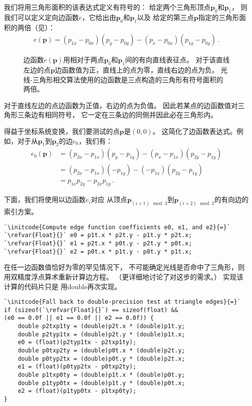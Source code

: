 我们将用三角形面积的该表达式定义有符号的：
给定两个三角形顶点$\bm p_0$和$\bm p_1$，
则我们可以定义定向边函数$e$，它给出由$\bm p_0$和$\bm p_1$以及
给定的第三点$\bm p$指定的三角形面积的两倍（见）：
\begin{align}\label{eq:3.1}
    e(\bm p)=(p_{1x}-p_{0x})(p_y-p_{0y})-(p_x-p_{0x})(p_{1y}-p_{0y})\, .
\end{align}
\begin{figure}[htbp]
    \centering
    \caption{边函数$e(\bm p)$用相对于两点$\bm p_0$和$\bm p_1$间的有向直线表征点。
        对于该直线左边的点$\bm p$边函数值为正，直线上的点为零，直线右边的点为负。
        光线-三角形相交算法使用的边函数是三点构造的三角形有符号面积的两倍。}
    \label{fig:3.14}
\end{figure}

对于直线左边的点边函数为正值，右边的点为负值。
因此若某点的边函数值对三角形三条边有相同符号，
它一定在三条边的同侧并因此必在三角形内。

得益于坐标系统变换，我们要测试的点$\bm p$是$(0,0)$。
这简化了边函数表达式。例如，对于从$\bm p_1$到$\bm p_2$的边$e_0$，我们有：
\begin{align}\label{eq:3.2}
    e_0(\bm p) & =(p_{2x}-p_{1x})(p_y-p_{1y})-(p_x-p_{1x})(p_{2y}-p_{1y})\nonumber \\
               & =(p_{2x}-p_{1x})(-p_{1y})-(-p_{1x})(p_{2y}-p_{1y})\nonumber       \\
               & =p_{1x}p_{2y}-p_{2x}p_{1y}\, .
\end{align}

下面，我们将使用以边函数$e_i$对应
从顶点$\bm p_{(i+1)\mod{3}}$到$\bm p_{(i+2)\mod{3}}$的有向边的索引方案。
\begin{lstlisting}
`\initcode{Compute edge function coefficients e0, e1, and e2}{=}`
`\refvar{Float}{}` e0 = p1t.x * p2t.y - p1t.y * p2t.x;
`\refvar{Float}{}` e1 = p2t.x * p0t.y - p2t.y * p0t.x;
`\refvar{Float}{}` e2 = p0t.x * p1t.y - p0t.y * p1t.x;
\end{lstlisting}

在任一边函数值恰好为零的罕见情况下，
不可能确定光线是否命中了三角形，则用双精度浮点算术重新计算边方程。
（更详细地讨论了对这步的需求。）
实现该计算的代码片只是
用{\ttfamily double}再次实现。
\begin{lstlisting}
`\initcode{Fall back to double-precision test at triangle edges}{=}`
if (sizeof(`\refvar{Float}{}`) == sizeof(float) &&
(e0 == 0.0f || e1 == 0.0f || e2 == 0.0f)) {
    double p2txp1ty = (double)p2t.x * (double)p1t.y;
    double p2typ1tx = (double)p2t.y * (double)p1t.x;
    e0 = (float)(p2typ1tx - p2txp1ty);
    double p0txp2ty = (double)p0t.x * (double)p2t.y;
    double p0typ2tx = (double)p0t.y * (double)p2t.x;
    e1 = (float)(p0typ2tx - p0txp2ty);
    double p1txp0ty = (double)p1t.x * (double)p0t.y;
    double p1typ0tx = (double)p1t.y * (double)p0t.x;
    e2 = (float)(p1typ0tx - p1txp0ty);
}
\end{lstlisting}

